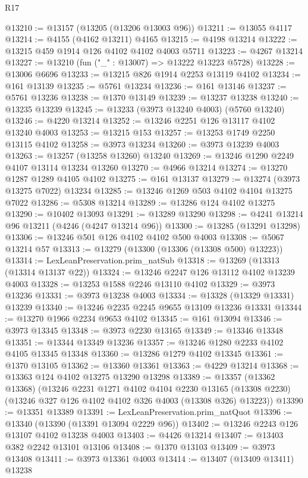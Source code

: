 \begin{lexlean}{R17}
\begin{coremodule}
@13210 := @13157 (@13205 (@13206 @13003 @96))
@13211 := @13055 @4117
@13214 := @4155 (@4162 @13211) @4165
@13215 := @4198 @13214
@13222 := @13215 @459 @1914 @126 @4102 @4102 @4003 @5711
@13223 := @4267 @13214
@13227 := @13210 (fun ("_" : @13007) => @13222 @13223 @5728)
@13228 := @13006 @6696
@13233 := @13215 @826 @1914 @2253 @13119 @4102
@13234 := @161 @13139
@13235 := @5761 @13234
@13236 := @161 @13146
@13237 := @5761 @13236
@13238 := @1370 @13149
@13239 := @13237 @13238
@13240 := @13235 @13239
@13245 := @13233 (@3973 @13240 @4003) (@5760 @13240)
@13246 := @4220 @13214
@13252 := @13246 @2251 @126 @13117 @4102 @13240 @4003
@13253 := @13215 @153
@13257 := @13253 @1749 @2250 @13115 @4102
@13258 := @3973 @13234
@13260 := @3973 @13239 @4003
@13263 := @13257 (@13258 @13260) @13240
@13269 := @13246 @1290 @2249 @4107 @13114 @13234 @13260
@13270 := @4966 @13214
@13274 := @13270 @1287 @1289 @4105 @4102
@13275 := @161 @13137
@13279 := @13274 (@3973 @13275 @7022) @13234
@13285 := @13246 @1269 @503 @4102 @4104 @13275 @7022
@13286 := @5308 @13214
@13289 := @13286 @124 @4102 @13275
@13290 := @10402 @13093
@13291 := @13289 @13290
@13298 := @4241 @13214 @96 @13211 (@4246 (@4247 @13214 @96))
@13300 := @13285 (@13291 @13298)
@13306 := @13246 @501 @126 @4102 @4102 @500 @4003
@13308 := @5067 @13214 @57
@13313 := @13279 (@13300 (@13306 (@13308 @500) @13223))
@13314 := LexLeanPreservation.prim_natSub
@13318 := @13269 (@13313 (@13314 @13137 @22))
@13324 := @13246 @2247 @126 @13112 @4102 @13239 @4003
@13328 := @13253 @1588 @2246 @13110 @4102
@13329 := @3973 @13236
@13331 := @3973 @13238 @4003
@13334 := @13328 (@13329 @13331) @13239
@13340 := @13246 @2235 @2245 @9655 @13109 @13236 @13331
@13344 := @13270 @1966 @2234 @9653 @4102
@13345 := @161 @13094
@13346 := @3973 @13345
@13348 := @3973 @2230 @13165
@13349 := @13346 @13348
@13351 := @13344 @13349 @13236
@13357 := @13246 @1280 @2233 @4102 @4105 @13345 @13348
@13360 := @13286 @1279 @4102 @13345
@13361 := @1370 @13105
@13362 := @13360 @13361
@13363 := @4229 @13214
@13368 := @13363 @124 @4102 @13275 @13290 @13298
@13389 := @13357
    (@13362 @13368)
    (@13246
      @2231
      @1271
      @4102
      @4104
      @2230
      @13165
      (@13308 @2230)
      (@13246 @327 @126 @4102 @4102 @326 @4003 (@13308 @326) @13223))
@13390 := @13351 @13389
@13391 := LexLeanPreservation.prim_natQuot
@13396 := @13340 (@13390 (@13391 @13094 @2229 @96))
@13402 := @13246 @2243 @126 @13107 @4102 @13238 @4003
@13403 := @4426 @13214
@13407 := @13403 @382 @2242 @13101 @13106
@13408 := @1370 @13103
@13409 := @3973 @13408
@13411 := @3973 @13361 @4003
@13414 := @13407 (@13409 @13411) @13238

\end{coremodule}
\end{lexlean}
